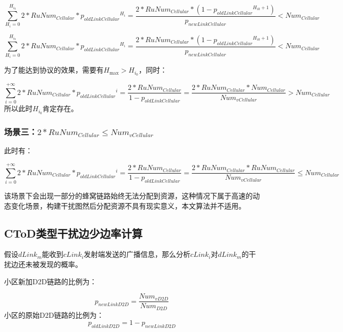 \documentclass[figurelist,tablelist,algorithmlist,nomlist,masters]{seuthesix}
\begin{document}
	\begin{equation}\label{eq3.1}
	\sum\limits_{{H_i} = 0}^{{H_{{i_0}}}} {2*RuNu{m_{Cellular}}*{p_{oldLinkCellular}}^{{H_i}}}  = \frac{{2*RuNu{m_{Cellular}}*(1 - {p_{oldLinkCellular}}^{{H_{i0}} + 1})}}{{{p_{newLinkCellular}}}} < Nu{m_{Cellular}}
	\end{equation}
	
	\begin{equation}\label{eq3.1}
	\sum\limits_{{H_i} = 0}^{{H_{{i_0}}}} {2*RuNu{m_{Cellular}}*{p_{oldLinkCellular}}^{{H_i}}}  = \frac{{2*RuNu{m_{Cellular}}*(1 - {p_{oldLinkCellular}}^{{H_{i0}} + 1})}}{{{p_{newLinkCellular}}}} < Nu{m_{Cellular}}
	\end{equation}
	
	为了能达到协议的效果，需要有${H_{\max }} > {H_{{i_0}}}$，同时：
	
	\begin{equation}\label{eq3.1}
	\sum\limits_{i = 0}^{ + \infty } {2*RuNu{m_{Cellular}}*{p_{oldLinkCellular}}^i}  = \frac{{2*RuNu{m_{Cellular}}}}{{1 - {p_{oldLinkCellular}}}} = \frac{{2*RuNu{m_{Cellular}}*Nu{m_{Cellular}}}}{{Nu{m_{vCellular}}}} > Nu{m_{Cellular}}
	\end{equation}
	所以此时${H_{{i_0}}}$肯定存在。
	
	\subsubsection{场景三：$2*RuNu{m_{Cellular}} \le Nu{m_{vCellular}}$}
	此时有：
	
	\begin{equation}\label{eq3.1}
	\sum\limits_{i = 0}^{ + \infty } {2*RuNu{m_{Cellular}}*{p_{oldLinkCellular}}^i}  = \frac{{2*RuNu{m_{Cellular}}}}{{1 - {p_{oldLinkCellular}}}} = \frac{{2*RuNu{m_{Cellular}}*RuNu{m_{Cellular}}}}{{Nu{m_{vCellular}}}} \le Nu{m_{Cellular}}
	\end{equation}
	
	该场景下会出现一部分的蜂窝链路始终无法分配到资源，这种情况下属于高速的动态变化场景，构建干扰图然后分配资源不具有现实意义，本文算法并不适用。
	
	
	\subsection{CToD类型干扰边少边率计算}
	假设$dLink_m$能收到$cLink_i$发射端发送的广播信息，那么分析$cLink_i$对$dLink_m$的干扰边还未被发现的概率。
	
	小区新加D2D链路的比例为：
	
	\begin{equation}\label{eq3.1}
	{p_{newLinkD2D}} = \frac{{Nu{m_{vD2D}}}}{{Nu{m_{D2D}}}}
	\end{equation}
	小区的原始D2D链路的比例为：
	\begin{equation}\label{eq3.1}
	{p_{oldLinkD2D}} = 1 - {p_{newLinkD2D}}
	\end{equation}
	
\end{document}

